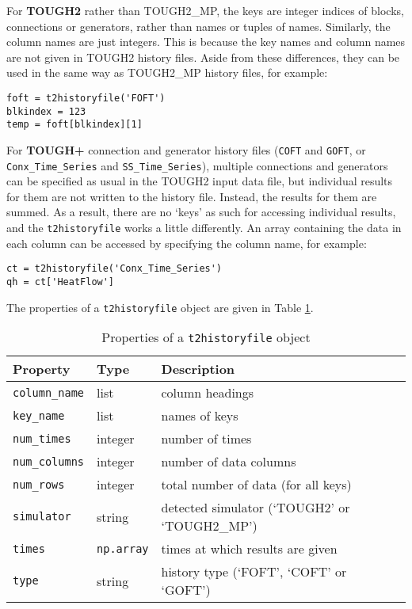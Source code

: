 For \textbf{TOUGH2} rather than TOUGH2\_MP, the keys are integer indices of blocks, connections or generators, rather than names or tuples of names.  Similarly, the column names are just integers.  This is because the key names and column names are not given in TOUGH2 history files.  Aside from these differences, they can be used in the same way as TOUGH2\_MP history files, for example:

\begin{lstlisting}
foft = t2historyfile('FOFT')
blkindex = 123
temp = foft[blkindex][1]
\end{lstlisting}

For \textbf{TOUGH+} connection and generator history files (\texttt{COFT} and \texttt{GOFT}, or \texttt{Conx\_Time\_Series} and \texttt{SS\_Time\_Series}), multiple connections and generators can be specified as usual in the TOUGH2 input data file, but individual results for them are not written to the history file.  Instead, the results for them are summed.  As a result, there are no `keys' as such for accessing individual results, and the \texttt{t2historyfile} works a little differently.  An array containing the data in each column can be accessed by specifying the column name, for example:

\begin{lstlisting}
ct = t2historyfile('Conx_Time_Series')
qh = ct['HeatFlow']
\end{lstlisting}

The properties of a \texttt{t2historyfile} object are given in Table \ref{tb:historyfile_properties}.

\begin{table}
  \begin{center}
    \begin{tabular}{|l|l|l|}
      \hline
      \textbf{Property} & \textbf{Type} & \textbf{Description}\\
      \hline
      \texttt{column\_name} & list & column headings\\
      \texttt{key\_name} & list & names of keys\\
      \texttt{num\_times} & integer & number of times\\
      \texttt{num\_columns} & integer & number of data columns\\
      \texttt{num\_rows} & integer & total number of data (for all keys)\\
      \texttt{simulator} & string & detected simulator (`TOUGH2' or `TOUGH2\_MP')\\
      \texttt{times} & \texttt{np.array} & times at which results are given\\
      \texttt{type} & string & history type (`FOFT', `COFT' or `GOFT')\\
      \hline
    \end{tabular}
    \caption{Properties of a \texttt{t2historyfile} object}
    \label{tb:historyfile_properties}
  \end{center}
\end{table}


